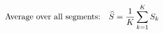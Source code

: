 \documentclass[preview]{standalone}
\begin{document}
\begin{align*}
\special{dvisvgm:raw <g id='unique000'>}\text{Average over all segments:}\quad \widehat{S}=\frac{1}{K}\sum_{k=1}^{K}S_k\special{dvisvgm:raw </g>}
\end{align*}
\end{document}

